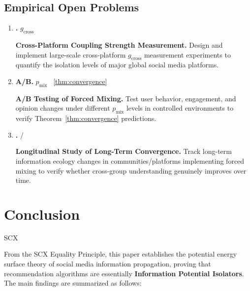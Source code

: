\documentclass[11pt,a4paper]{article}
\theoremstyle{remark}
\newcommand{\GCoupling}{g_{\text{cross}}}
\begin{document}
\subsection{}

\subsection{Empirical Open Problems}

\begin{enumerate}[label=EP\arabic*:, leftmargin=*]
\item \textbf{.}
 $\GCoupling$ 


\textbf{Cross-Platform Coupling Strength Measurement.}
Design and implement large-scale cross-platform $\GCoupling$ measurement experiments
to quantify the isolation levels of major global social media platforms.

\medskip
\item \textbf{A/B.}
 $p_{\text{mix}}$ 
~\ref{thm:convergence} 

\textbf{A/B Testing of Forced Mixing.}
Test user behavior, engagement, and opinion changes under different $p_{\text{mix}}$
levels in controlled environments to verify Theorem~\ref{thm:convergence} predictions.

\medskip
\item \textbf{.}
/


\textbf{Longitudinal Study of Long-Term Convergence.}
Track long-term information ecology changes in communities/platforms implementing
forced mixing to verify whether cross-group understanding genuinely improves over time.
\end{enumerate}

\section{}
\section{Conclusion}

SCX
\textbf{}


From the SCX Equality Principle, this paper establishes the potential energy surface
theory of social media information propagation, proving that recommendation algorithms
are essentially \textbf{Information Potential Isolators}. The main findings are
summarized as follows:
\end{document}

